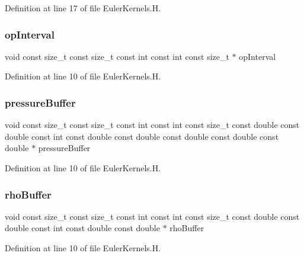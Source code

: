 Definition at line 17 of file Euler\+Kernels.\+H.

\hypertarget{EulerKernels_8H_a213a90a5a4736a5c5fc0c0220cdcb661}{}\label{EulerKernels_8H_a213a90a5a4736a5c5fc0c0220cdcb661} 
\subsubsection{\texorpdfstring{op\+Interval}{opInterval}}
{\footnotesize\ttfamily void const size\+\_\+t const size\+\_\+t const int const int const size\+\_\+t $\ast$ op\+Interval}



Definition at line 10 of file Euler\+Kernels.\+H.

\hypertarget{EulerKernels_8H_a3f74513474f35805900c6fae145a2e22}{}\label{EulerKernels_8H_a3f74513474f35805900c6fae145a2e22} 
\subsubsection{\texorpdfstring{pressure\+Buffer}{pressureBuffer}}
{\footnotesize\ttfamily void const size\+\_\+t const size\+\_\+t const int const int const size\+\_\+t const double const double const int const double const double const double const double const double $\ast$ pressure\+Buffer}



Definition at line 10 of file Euler\+Kernels.\+H.

\hypertarget{EulerKernels_8H_a3b7eb563e35c212b5ad0d1fdfd72d1dd}{}\label{EulerKernels_8H_a3b7eb563e35c212b5ad0d1fdfd72d1dd} 
\subsubsection{\texorpdfstring{rho\+Buffer}{rhoBuffer}}
{\footnotesize\ttfamily void const size\+\_\+t const size\+\_\+t const int const int const size\+\_\+t const double const double const int const double const double $\ast$ rho\+Buffer}



Definition at line 10 of file Euler\+Kernels.\+H.

